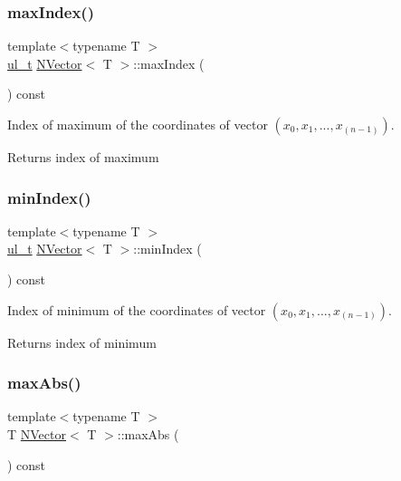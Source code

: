 \subsubsection{\texorpdfstring{maxIndex()}{maxIndex()}}
{\footnotesize\ttfamily template$<$typename T $>$ \\
\mbox{\hyperlink{group___n_algebra_ga1b140a2034db3f5dfe18a987745df43a}{ul\+\_\+t}} \mbox{\hyperlink{class_n_vector}{N\+Vector}}$<$ T $>$\+::max\+Index (\begin{DoxyParamCaption}{ }\end{DoxyParamCaption}) const}



Index of maximum of the coordinates of vector $ (x_0, x_1, ..., x_{(n-1)}) $. 

\begin{DoxyReturn}{Returns}
index of maximum 
\end{DoxyReturn}
\mbox{\label{class_n_vector_aea9d0e6c8b20628b5e09f8194484a8d3}} 
\subsubsection{\texorpdfstring{minIndex()}{minIndex()}}
{\footnotesize\ttfamily template$<$typename T $>$ \\
\mbox{\hyperlink{group___n_algebra_ga1b140a2034db3f5dfe18a987745df43a}{ul\+\_\+t}} \mbox{\hyperlink{class_n_vector}{N\+Vector}}$<$ T $>$\+::min\+Index (\begin{DoxyParamCaption}{ }\end{DoxyParamCaption}) const}



Index of minimum of the coordinates of vector $ (x_0, x_1, ..., x_{(n-1)}) $. 

\begin{DoxyReturn}{Returns}
index of minimum 
\end{DoxyReturn}
\mbox{\label{class_n_vector_a2d77a1ff10574ae5ca33fb3c11a087e2}} 
\subsubsection{\texorpdfstring{maxAbs()}{maxAbs()}}
{\footnotesize\ttfamily template$<$typename T $>$ \\
T \mbox{\hyperlink{class_n_vector}{N\+Vector}}$<$ T $>$\+::max\+Abs (\begin{DoxyParamCaption}{ }\end{DoxyParamCaption}) const}



